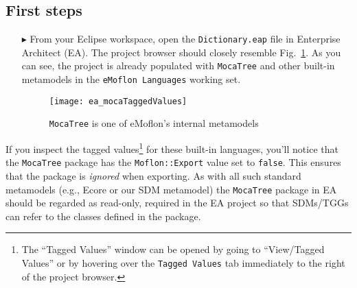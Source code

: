 \newpage
\hypertarget{initialize vis}{}
\subsection{First steps}
\visHeader

\begin{itemize}

\item[$\blacktriangleright$] From your Eclipse workspace, open the \texttt{Dict\-ion\-ary.eap} file in Enterprise Architect (EA). The project browser should
closely resemble Fig.~\ref{ea:mocaTagged}. As you can see, the project is already populated with \texttt{MocaTree} and other built-in metamodels
in the \texttt{eMoflon Languages} working set.

\vspace{0.5cm}

\begin{figure}[htpb]
\begin{center}
  \texttt{[image: ea\_mocaTaggedValues]}
  \caption{\texttt{MocaTree} is one of eMoflon's internal metamodels}
  \label{ea:mocaTagged}
\end{center}
\end{figure}

\end{itemize}

\vspace{-0.5cm}

If you inspect the tagged values\footnote{The ``Tagged Values'' window can be opened by going to ``View/Tagged Values'' or by hovering over the \texttt{Tagged
Values} tab immediately to the right of the project browser.} for these built-in languages, you'll notice that the \texttt{MocaTree} package has the
\texttt{Moflon::Export} value set to \texttt{false}. This ensures that the package is \emph{ignored} when exporting. As with all such standard metamodels (e.g.,
Ecore or our SDM metamodel) the \texttt{MocaTree} package in EA should be regarded as read-only, required in the EA project so that SDMs/TGGs can refer to
the classes defined in the package.

